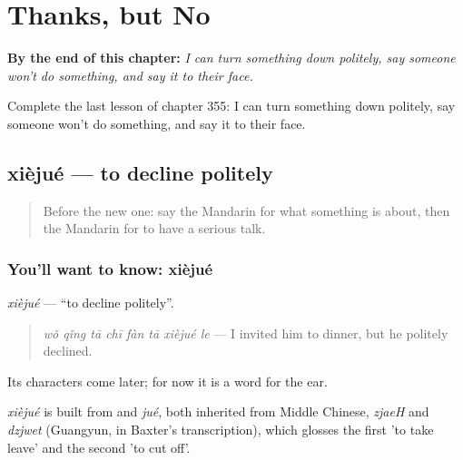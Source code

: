 
\chapter{Thanks, but No}
\label{ch:zh-thanks-but-no}

\begin{chapteropening}
\textbf{By the end of this chapter:} \emph{I can turn something down politely, say someone won't do something, and say it to their face.}

Complete the last lesson of chapter 355: I can turn something down politely, say someone won't do something, and say it to their face.
\end{chapteropening}

\section[xièjué]{xièjué — to decline politely}

\label{lesson:ZH-C355-xiejue}



\begin{quote}
Before the new one: say the Mandarin for what something is about, then the Mandarin for to have a serious talk.
\end{quote}

\subsection*{You'll want to know: xièjué}
\emph{xièjué} — \textquotedblleft{}to decline politely\textquotedblright{}.

\begin{quote}
\emph{wǒ qǐng tā chī fàn tā xièjué le} — I invited him to dinner, but he politely declined.
\end{quote}

Its characters come later; for now it is a word for the ear.

\begin{cousinweb}
\emph{xièjué} is built from  and \emph{jué}, both inherited from Middle Chinese, \emph{zjaeH} and \emph{dzjwet} (Guangyun, in Baxter's transcription), which glosses the first 'to take leave' and the second 'to cut off'.
\end{cousinweb}

